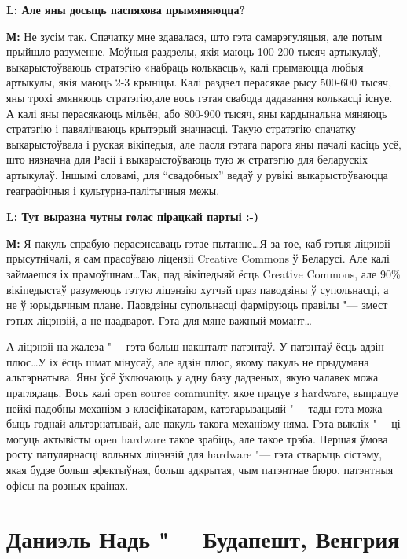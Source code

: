 \documentclass[10pt, a5paper]{article}
\begin{document}
{\noindent \bf L: Але яны досыць паспяхова прымяняюцца?}

{\noindent \bf М:} Не зусім так. Спачатку мне здавалася, што гэта самарэгуляцыя, але потым прыйшло разуменне. Моўныя раздзелы, якія маюць 100-200 тысяч артыкулаў, выкарыстоўваюць стратэгію «набраць колькасць», калі прымаюцца любыя артыкулы, якія маюць 2-3 крыніцы. Калі раздзел перасякае рысу 500-600 тысяч, яны трохі змяняюць стратэгію,але вось гэтая свабода дадавання колькасці існуе. А калі яны перасякаюць мільён, або 800-900 тысяч, яны кардынальна мяняюць стратэгію і павялічваюць крытэрый значнасці. Такую стратэгію спачатку выкарыстоўвала і руская вікіпедыя, але пасля гэтага парога яны пачалі касіць усё, што нязначна для Расіі і выкарыстоўваюць тую ж стратэгію для беларускіх артыкулаў. Іншымі словамі, для “свадобных” ведаў у рувікі выкарыстоўваюцца геаграфічныя і культурна-палітычныя межы.


{\noindent \bf L: Тут выразна чутны голас пірацкай партыі :-)}

{\noindent \bf М:} Я пакуль спрабую перасэнсаваць гэтае пытанне\ldots Я за тое, каб гэтыя ліцэнзіі прысутнічалі, я сам прасоўваю ліцензіі Creative Com\-mons ў Беларусі. Але калі займаешся іх прамоўшнам\ldots Так, пад вікіпедыяй ёсць Creatіve Commons, але 90\% вікіпедыстаў разумеюць гэтую ліцэнзію хутчэй праз паводзіны ў супольнасці, а не ў юрыдычным плане. Паовдзіны супольнасці фарміруюць правілы "--- змест гэтых ліцэнзій, а не наадварот. Гэта для мяне важный момант\ldots

А ліцэнзіі на жалеза "--- гэта больш накшталт патэнтаў. У патэнтаў ёсць адзін плюс\ldots У іх ёсць шмат мінусаў, але адзін плюс, якому пакуль не прыдумана альтэрнатыва. Яны ўсё ўключаюць у адну базу дадзеных, якую чалавек можа праглядаць. Вось калі open source community, якое працуе з hardware, выпрацуе нейкі падобны механізм з класіфікатарам, катэгарызацыяй "--- тады гэта можа быць годнай альтэрнатывай, але пакуль такога механізму няма. Гэта выклік "--- ці могуць актывісты open hardware такое зрабіць, але такое трэба. Першая ўмова росту папулярнасці вольных ліцэнзій для hardware "--- гэта стварыць сістэму, якая будзе больш эфектыўная, больш адкрытая, чым патэнтнае бюро, патэнтныя офісы па розных краінах.


\section{Даниэль Надь "---  Будапешт, Венгрия}
\end{document}
